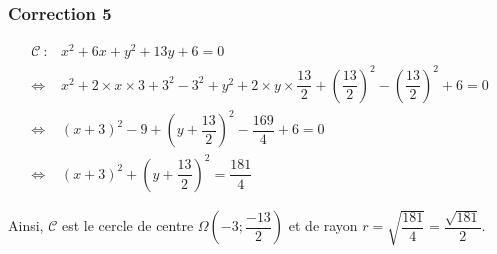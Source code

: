 \documentclass[15pt, mathserif]{beamer}
\begin{document}
\begin{frame}
\vspace{-10mm}
	\frametitle{Correction 5}
\begin{align*}\mathcal{C} ~: & x^2+6x + y^2+13y+6= 0 \\
	 \Leftrightarrow & x^2+2\times x \times 3+3^2-3^2+y^2+2\times y \times \dfrac{13}{2}+\left(\dfrac{13}{2}\right)^2- \left(\dfrac{13}{2}\right)^2+6= 0 \\
	 \Leftrightarrow & \left( x+3\right)^2-9+\left( y+\dfrac{13}{2}\right)^2-\dfrac{169}{4}+6= 0 \\
	 \Leftrightarrow & \left( x+3\right)^2+\left( y+\dfrac{13}{2}\right)^2 = \dfrac{181}{4}
 \end{align*} 

 \bigskip 

 Ainsi, $\mathcal{C}$ est le cercle de centre $\Omega \left( -3;\dfrac{-13}{2}\right)$ et de rayon $r = \sqrt{\dfrac{181}{4}}= \dfrac{\sqrt{181}}{2}$.\end{frame}
\end{document}
